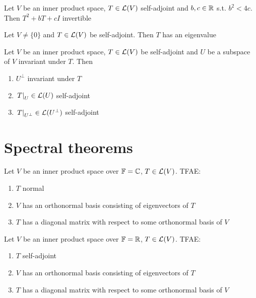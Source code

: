 \documentclass[aspectratio=169]{beamer}
\begin{document}
\begin{frame}
\begin{theorem}
Let $V$ be an inner product space, $T\in\mathcal{L}(V)$ self-adjoint and $b,c\in\mathbb{R}$ s.t. $b^2<4c$. Then $T^2+bT+cI$ invertible
\end{theorem}

\begin{theorem}
Let $V\neq\{0\}$ and $T\in\mathcal{L}(V)$ be self-adjoint. Then $T$ has an eigenvalue
\end{theorem}

\begin{theorem}
Let $V$ be an inner product space, $T\in\mathcal{L}(V)$ be self-adjoint and $U$ be a subspace of $V$ invariant under $T$. Then
\begin{enumerate}
\item $U^\perp$ invariant under $T$
\item $\left.T\right|_{U}\in\mathcal{L}(U)$ self-adjoint
\item $\left.T\right|_{U^\perp}\in\mathcal{L}(U^\perp)$ self-adjoint
\end{enumerate}
\end{theorem}
\end{frame}


\section{Spectral theorems}

\begin{frame}
\begin{importanttheorem}
Let $V$ be an inner product space over $\mathbb{F}=\mathbb{C}$, $T\in\mathcal{L}(V)$. TFAE:
\begin{enumerate}
\item $T$ normal
\item $V$ has an orthonormal basis consisting of eigenvectors of $T$
\item $T$ has a diagonal matrix with respect to some orthonormal basis of $V$
\end{enumerate}
\end{importanttheorem}
\vfill
\begin{importanttheorem}
Let $V$ be an inner product space over $\mathbb{F}=\mathbb{R}$, $T\in\mathcal{L}(V)$. TFAE:
\begin{enumerate}
\item $T$ self-adjoint
\item $V$ has an orthonormal basis consisting of eigenvectors of $T$
\item $T$ has a diagonal matrix with respect to some orthonormal basis of $V$
\end{enumerate}
\end{importanttheorem}
\end{frame}
\end{document}
